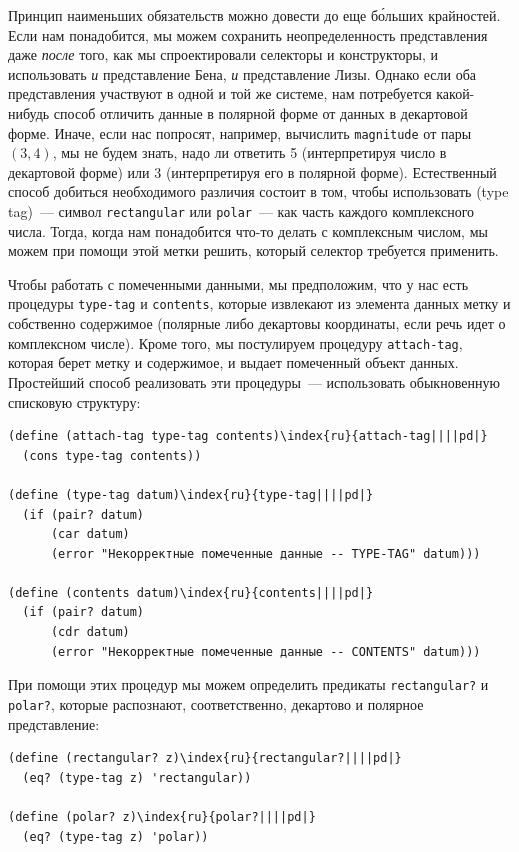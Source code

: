 Принцип наименьших обязательств можно довести до еще
б\'ольших крайностей.  Если нам понадобится, мы можем
сохранить неопределенность представления даже {\em после} того,
как мы спроектировали селекторы и конструкторы, и использовать
{\em и} представление Бена, {\em и} представление
Лизы.  Однако если оба представления участвуют в одной и той же
системе, нам потребуется какой-нибудь способ отличить данные в
полярной форме от данных в декартовой форме.  Иначе, если нас
попросят, например, вычислить {\tt magnitude} от пары 
$(3,4)$, мы не будем знать, надо ли ответить 5
(интерпретируя число в декартовой форме) или 3 (интерпретируя его в
полярной форме).  Естественный способ добиться необходимого различия
состоит в том, чтобы использовать 
 (type tag)~--- символ
{\tt rectangular} или {\tt polar}~--- как часть каждого
комплексного числа.  Тогда, когда нам понадобится что-то делать с
комплексным числом, мы можем при помощи этой метки решить, который
селектор требуется применить.

Чтобы работать с помеченными данными, мы предположим, что
у нас есть процедуры {\tt type-tag} и {\tt contents},
которые извлекают из элемента данных метку и собственно содержимое
(полярные либо декартовы координаты, если речь идет о комплексном
числе).  Кроме того, мы постулируем процедуру {\tt attach-tag},
которая берет метку и содержимое, и выдает помеченный объект данных.
Простейший способ реализовать эти процедуры~--- использовать
обыкновенную списковую структуру:

\begin{Verbatim}[fontsize=\small]
(define (attach-tag type-tag contents)\index{ru}{attach-tag||||pd|}
  (cons type-tag contents))

(define (type-tag datum)\index{ru}{type-tag||||pd|}
  (if (pair? datum)
      (car datum)
      (error "Некорректные помеченные данные -- TYPE-TAG" datum)))

(define (contents datum)\index{ru}{contents||||pd|}
  (if (pair? datum)
      (cdr datum)
      (error "Некорректные помеченные данные -- CONTENTS" datum)))
\end{Verbatim}

При помощи этих процедур мы можем определить предикаты
{\tt rec\-tan\-gu\-lar?} и {\tt polar?}, которые распознают,
соответственно, декартово и полярное представление:

\begin{Verbatim}[fontsize=\small]
(define (rectangular? z)\index{ru}{rectangular?||||pd|}
  (eq? (type-tag z) 'rectangular))

(define (polar? z)\index{ru}{polar?||||pd|}
  (eq? (type-tag z) 'polar))
\end{Verbatim}

